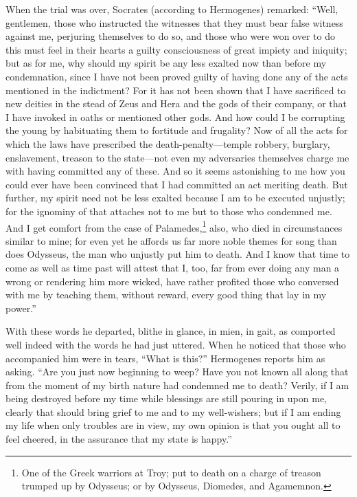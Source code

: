 \documentclass[12pt]{article}
\begin{document}
When the trial was over, Socrates (according to Hermogenes) remarked: ``Well,
gentlemen, those who instructed the witnesses that they must bear false witness
against me, perjuring themselves to do so, and those who were won over to do
this must feel in their hearts a guilty consciousness of great impiety and
iniquity; but as for me, why should my spirit be any less exalted now than
before my condemnation, since I have not been proved guilty of having done any
of the acts mentioned in the indictment? For it has not been shown that I have
sacrificed to new deities in the stead of Zeus and Hera and the gods of their
company, or that I have invoked in oaths or mentioned other gods. And how could
I be corrupting the young by habituating them to fortitude and frugality? Now
of all the acts for which the laws have prescribed the death-penalty---temple
robbery, burglary, enslavement, treason to the state---not even my adversaries
themselves charge me with having committed any of these. And so it seems
astonishing to me how you could ever have been convinced that I had committed
an act meriting death. But further, my spirit need not be less exalted because
I am to be executed unjustly; for the ignominy of that attaches not to me but
to those who condemned me. And I get comfort from the case of
Palamedes,\footnote{One of the Greek warriors at Troy; put to death on a charge
of treason trumped up by Odysseus; or by Odysseus, Diomedes, and Agamemnon.}
also, who died in circumstances similar to mine; for even yet he affords us far
more noble themes for song than does Odysseus, the man who unjustly put him to
death. And I know that time to come as well as time past will attest that I,
too, far from ever doing any man a wrong or rendering him more wicked, have
rather profited those who conversed with me by teaching them, without reward,
every good thing that lay in my power.''

With these words he departed, blithe in glance, in mien, in gait, as comported
well indeed with the words he had just uttered. When he noticed that those who
accompanied him were in tears, ``What is this?'' Hermogenes reports him as
asking. ``Are you just now beginning to weep? Have you not known all along that
from the moment of my birth nature had condemned me to death? Verily, if I am
being destroyed before my time while blessings are still pouring in upon me,
clearly that should bring grief to me and to my well-wishers; but if I am
ending my life when only troubles are in view, my own opinion is that you ought
all to feel cheered, in the assurance that my state is happy.''
\end{document}
